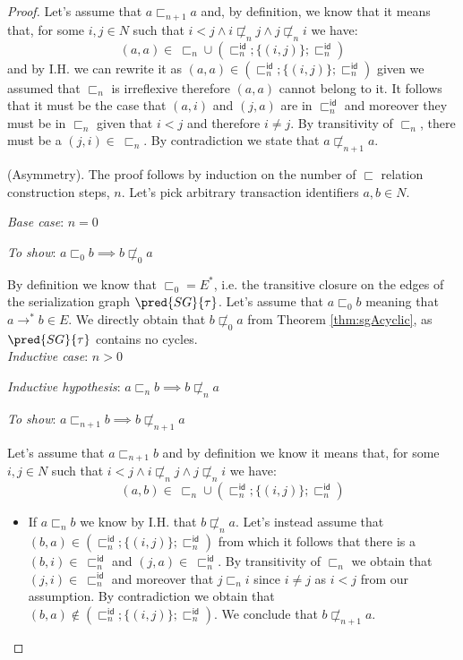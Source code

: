 \begin{thm}
\begin{proof}
{	Let's assume that $a \sqsubset_{n+1} a$ and, by definition, we know that it means that, for some $i, j \in N$ such that $i < j \land i \not\sqsubset_n j \land j \not\sqsubset_n i$ we have:
	\[
		(a, a) \in\ \sqsubset_n \cup \left( \sqsubset_n^\mathsf{id} ; \{ (i, j) \} ; \sqsubset_n ^\mathsf{id} \right)
	\]
	and by I.H. we can rewrite it as $(a, a) \in \left( \sqsubset_n^\mathsf{id} ; \{ (i, j) \} ; \sqsubset_n ^\mathsf{id} \right)$ given we assumed that $\sqsubset_n$ is irreflexive therefore $(a, a)$ cannot belong to it. It follows that it must be the case that $(a, i)$ and $(j, a)$ are in $\sqsubset_n^\mathsf{id}$ and moreover they must be in $\sqsubset_n$ given that $i < j$ and therefore $i \neq j$. By transitivity of $\sqsubset_n$, there must be a $(j, i) \in\ \sqsubset_n$. By contradiction we state that $a \not\sqsubset_{n+1} a$. \\
	}
	
	(Asymmetry). The proof follows by induction on the number of $\sqsubset$ relation construction steps, $n$. Let's pick arbitrary transaction identifiers $a, b \in N$.
	
	{\parindent0pt
	\textit{Base case}: $n = 0$
	
	\textit{To show}: $a \sqsubset_0 b \implies b \not\sqsubset_0 a$
	
	By definition we know that $\sqsubset_0 = E^*$, i.e. the transitive closure on the edges of the serialization graph $\pred{SG}{\tau}$. Let's assume that $a \sqsubset_0 b$ meaning that $a \rightarrow^* b \in E$. We directly obtain that $b \not\sqsubset_0 a$ from Theorem \ref{thm:sgAcyclic}, as $\pred{SG}{\tau}$ contains no cycles. \\
	
	\textit{Inductive case}: $n > 0$
	
	\textit{Inductive hypothesis}: $a \sqsubset_n b \implies b \not\sqsubset_n a$
	
	\textit{To show}: $a \sqsubset_{n + 1} b \implies b \not\sqsubset_{n + 1} a$
	
	Let's assume that $a \sqsubset_{n + 1} b$ and by definition we know it means that, for some $i, j \in N$ such that $i < j \land i \not\sqsubset_n j \land j \not\sqsubset_n i$ we have:
	\[
		(a, b) \in\ \sqsubset_n \cup \left( \sqsubset_n^\mathsf{id} ; \{ (i, j) \} ; \sqsubset_n ^\mathsf{id} \right)
	\]
	\begin{itemize}
		\item If $a \sqsubset_n b$ we know by I.H. that $b \not\sqsubset_n a$. Let's instead assume that $(b, a) \in \left( \sqsubset_n^\mathsf{id} ; \{ (i, j) \} ; \sqsubset_n ^\mathsf{id} \right)$ from which it follows that there is a $(b, i) \in\ \sqsubset_n^\mathsf{id}$ and $(j, a) \in\ \sqsubset_n^\mathsf{id}$. By transitivity of $\sqsubset_n$ we obtain that $(j, i) \in\ \sqsubset_n^\mathsf{id}$ and moreover that $j \sqsubset_n i$ since $i \neq j$ as $i < j$ from our assumption. By contradiction we obtain that $(b, a) \not\in \left( \sqsubset_n^\mathsf{id} ; \{ (i, j) \} ; \sqsubset_n ^\mathsf{id} \right)$. We conclude that $b \not\sqsubset_{n + 1} a$.
		

\end{itemize}}
\end{proof}
\end{thm}
